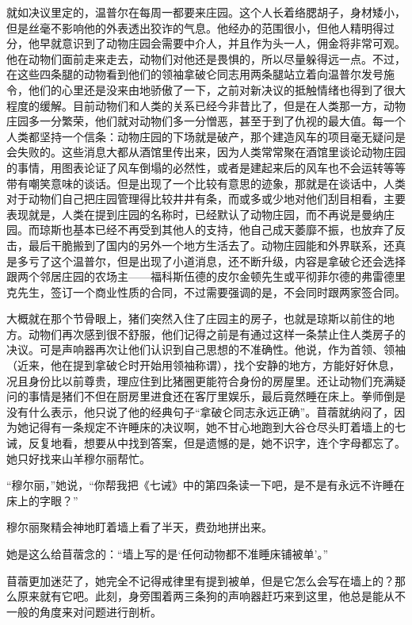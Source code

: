 就如决议里定的，温普尔在每周一都要来庄园。这个人长着络腮胡子，身材矮小，但是丝毫不影响他的外表透出狡诈的气息。他经办的范围很小，但他人精明得过分，他早就意识到了动物庄园会需要中介人，并且作为头一人，佣金将非常可观。他在动物们面前走来走去，动物们对他还是畏惧的，所以尽量躲得远一点。不过，在这些四条腿的动物看到他们的领袖拿破仑同志用两条腿站立着向温普尔发号施令，他们的心里还是没来由地骄傲了一下，之前对新决议的抵触情绪也得到了很大程度的缓解。目前动物们和人类的关系已经今非昔比了，但是在人类那一方，动物庄园多一分繁荣，他们就对动物们多一分憎恶，甚至于到了仇视的最大值。每一个人类都坚持一个信条：动物庄园的下场就是破产，那个建造风车的项目毫无疑问是会失败的。这些消息大都从酒馆里传出来，因为人类常常聚在酒馆里谈论动物庄园的事情，用图表论证了风车倒塌的必然性，或者是建起来后的风车也不会运转等等带有嘲笑意味的谈话。但是出现了一个比较有意思的迹象，那就是在谈话中，人类对于动物们自己把庄园管理得比较井井有条，而或多或少地对他们刮目相看，主要表现就是，人类在提到庄园的名称时，已经默认了动物庄园，而不再说是曼纳庄园。而琼斯也基本已经不再受到其他人的支持，他自己成天萎靡不振，也放弃了反击，最后干脆搬到了国内的另外一个地方生活去了。动物庄园能和外界联系，还真是多亏了这个温普尔，但是出现了小道消息，还不断升级，内容是拿破仑还会选择跟两个邻居庄园的农场主——福科斯伍德的皮尔金顿先生或平彻菲尔德的弗雷德里克先生，签订一个商业性质的合同，不过需要强调的是，不会同时跟两家签合同。

大概就在那个节骨眼上，猪们突然入住了庄园主的房子，也就是琼斯以前住的地方。动物们再次感到很不舒服，他们记得之前是有通过这样一条禁止住人类房子的决议。可是声响器再次让他们认识到自己思想的不准确性。他说，作为首领、领袖（近来，他在提到拿破仑时开始用领袖称谓），找个安静的地方，方能好好休息，况且身份比以前尊贵，理应住到比猪圈更能符合身份的房屋里。还让动物们充满疑问的事情是猪们不但在厨房里进食还在客厅里娱乐，最后竟然睡在床上。拳师倒是没有什么表示，他只说了他的经典句子“拿破仑同志永远正确”。苜蓿就纳闷了，因为她记得有一条规定不许睡床的决议啊，她不甘心地跑到大谷仓尽头盯着墙上的七诫，反复地看，想要从中找到答案，但是遗憾的是，她不识字，连个字母都忘了。她只好找来山羊穆尔丽帮忙。

“穆尔丽，”她说，“你帮我把《七诫》中的第四条读一下吧，是不是有永远不许睡在床上的字眼？”

穆尔丽聚精会神地盯着墙上看了半天，费劲地拼出来。

她是这么给苜蓿念的：“墙上写的是‘任何动物都不准睡床铺被单’。”

苜蓿更加迷茫了，她完全不记得戒律里有提到被单，但是它怎么会写在墙上的？那么原来就有它吧。此刻，身旁围着两三条狗的声响器赶巧来到这里，他总是能从不一般的角度来对问题进行剖析。

